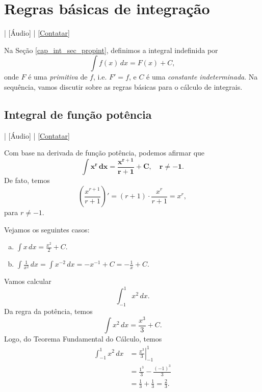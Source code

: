 \section{Regras básicas de integração}\label{cap_int_sec_regrasbasic}

\begin{flushright}
  [Vídeo] | [Áudio] | \href{https://phkonzen.github.io/notas/contato.html}{[Contatar]}
\end{flushright}

Na Seção \ref{cap_int_sec_propint}, definimos a integral indefinida por
\begin{equation}
  \int f(x)\,dx = F(x) + C,
\end{equation}
onde $F$ é uma \emph{primitiva} de $f$, i.e. $F' = f$, e $C$ é uma \emph{constante indeterminada}. Na sequência, vamos discutir sobre as regras básicas para o cálculo de integrais.

\subsection{Integral de função potência}

\begin{flushright}
  [Vídeo] | [Áudio] | \href{https://phkonzen.github.io/notas/contato.html}{[Contatar]}
\end{flushright}

Com base na derivada de função potência, podemos afirmar que
\begin{equation}
  \pmb{\int x^r\,dx = \frac{x^{r+1}}{r+1} + C,\quad r\neq -1}.
\end{equation}
De fato, temos
\begin{equation}
  \left(\frac{x^{r+1}}{r+1}\right)' = (r+1)\cdot \frac{x^r}{r+1} = x^r,
\end{equation}
para $r\neq -1$.

\begin{ex}
  Vejamos os seguintes casos:
  \begin{enumerate}[a)]
  \item $\displaystyle \int x\,dx = \frac{x^2}{2} + C$.
  \item $\displaystyle \int \frac{1}{x^2}\,dx = \int x^{-2}\,dx = -x^{-1} + C = -\frac{1}{x}+C$.
  \end{enumerate}
\end{ex}

\begin{ex}
  Vamos calcular
  \begin{equation}
    \int_{-1}^1 x^2\,dx.
  \end{equation}
  Da regra da potência, temos
  \begin{equation}
    \int x^2\,dx = \frac{x^3}{3} + C.
  \end{equation}
  Logo, do Teorema Fundamental do Cálculo, temos
  \begin{align}
    \int_{-1}^1 x^2\,dx &= \left.\frac{x^3}{3}\right|_{-1}^1 \\
                        &= \frac{1^3}{3} - \frac{(-1)^3}{3} \\
                        &= \frac{1}{3} + \frac{1}{3} = \frac{2}{3}.
  \end{align}
\end{ex}

